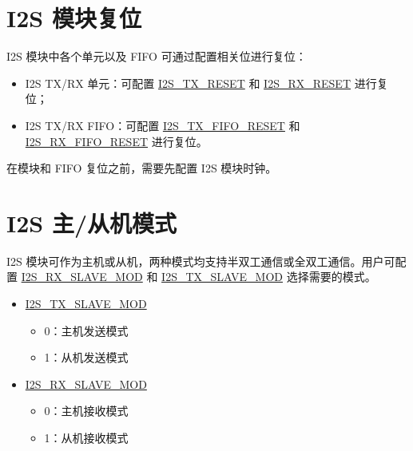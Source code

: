 \documentclass[main\_\_CN.tex]{subfiles}
\begin{document}
\section{I2S 模块复位} \label{sec:i2s-reset}

I2S 模块中各个单元以及 FIFO 可通过配置相关位进行复位：

\begin{itemize}
\item I2S TX/RX 单元：可配置 \hyperref[fielddesc:I2STXRESET]{I2S\_TX\_RESET} 和 \hyperref[fielddesc:I2SRXRESET]{I2S\_RX\_RESET} 进行复位；
\item I2S TX/RX FIFO：可配置 \hyperref[fielddesc:I2STXFIFORESET]{I2S\_TX\_FIFO\_RESET} 和 \hyperref[fielddesc:I2SRXFIFORESET]{I2S\_RX\_FIFO\_RESET} 进行复位。
\end{itemize}

\begin{tiplisting}
在模块和 FIFO 复位之前，需要先配置 I2S 模块时钟。
\end{tiplisting} 


\section{I2S 主/从机模式}

\chipname{} I2S 模块可作为主机或从机，两种模式均支持半双工通信或全双工通信。用户可配置  \hyperref[fielddesc:I2SRXSLAVEMOD]{I2S\_RX\_SLAVE\_MOD} 和 \hyperref[fielddesc:I2STXSLAVEMOD]{I2S\_TX\_SLAVE\_MOD} 选择需要的模式。

\begin{itemize}
    \item \hyperref[fielddesc:I2STXSLAVEMOD]{I2S\_TX\_SLAVE\_MOD} 
    \begin{itemize}
        \item 0：主机发送模式
        \item 1：从机发送模式
    \end{itemize}
    \item \hyperref[fielddesc:I2SRXSLAVEMOD]{I2S\_RX\_SLAVE\_MOD}
    \begin{itemize}
        \item 0：主机接收模式
        \item 1：从机接收模式
    \end{itemize}
\end{itemize}
\end{document}

